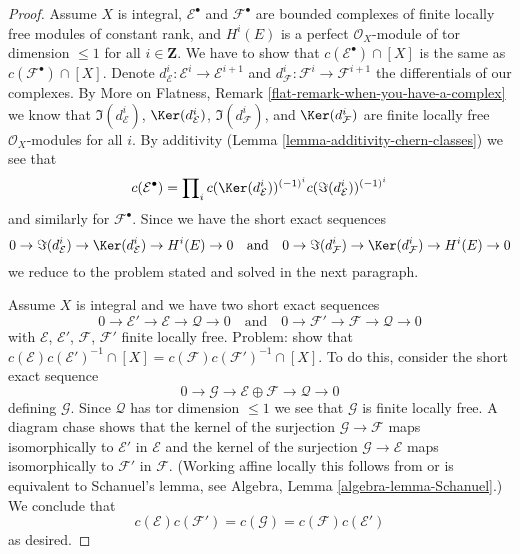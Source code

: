 \begin{proof}
\medskip\noindent
Assume $X$ is integral, $\mathcal{E}^\bullet$ and $\mathcal{F}^\bullet$
are bounded complexes of finite locally free modules of constant rank, and
$H^i(E)$ is a perfect $\mathcal{O}_X$-module of tor dimension $\leq 1$
for all $i \in \mathbf{Z}$. We have to
show that $c(\mathcal{E}^\bullet) \cap [X]$ is the same as
$c(\mathcal{F}^\bullet) \cap [X]$. Denote
$d_\mathcal{E}^i : \mathcal{E}^i \to \mathcal{E}^{i + 1}$ and
$d_\mathcal{F}^i : \mathcal{F}^i \to \mathcal{F}^{i + 1}$
the differentials of our complexes. By
More on Flatness, Remark \ref{flat-remark-when-you-have-a-complex}
we know that $\Im(d_\mathcal{E}^i)$, $\Ker(d_\mathcal{E}^i)$,
$\Im(d_\mathcal{F}^i)$, and $\Ker(d_\mathcal{F}^i)$
are finite locally free $\mathcal{O}_X$-modules for all $i$.
By additivity (Lemma \ref{lemma-additivity-chern-classes}) we see that
$$
c(\mathcal{E}^\bullet) = \prod\nolimits_i
c(\Ker(d_\mathcal{E}^i))^{(-1)^i} c(\Im(d_\mathcal{E}^i))^{(-1)^i}
$$
and similarly for $\mathcal{F}^\bullet$. Since we have the
short exact sequences
$$
0 \to \Im(d_\mathcal{E}^i) \to \Ker(d_\mathcal{E}^i) \to H^i(E) \to 0
\quad\text{and}\quad
0 \to \Im(d_\mathcal{F}^i) \to \Ker(d_\mathcal{F}^i) \to H^i(E) \to 0
$$
we reduce to the problem stated and solved in the next paragraph.

\medskip\noindent
Assume $X$ is integral and we have two short exact sequences
$$
0 \to \mathcal{E}' \to \mathcal{E} \to \mathcal{Q} \to 0
\quad\text{and}\quad
0 \to \mathcal{F}' \to \mathcal{F} \to \mathcal{Q} \to 0
$$
with $\mathcal{E}$, $\mathcal{E}'$, $\mathcal{F}$, $\mathcal{F}'$
finite locally free. Problem: show that
$c(\mathcal{E})c(\mathcal{E}')^{-1} \cap [X] =
c(\mathcal{F})c(\mathcal{F}')^{-1} \cap [X]$.
To do this, consider the short exact sequence
$$
0 \to \mathcal{G} \to \mathcal{E} \oplus \mathcal{F} \to \mathcal{Q} \to 0
$$
defining $\mathcal{G}$. Since $\mathcal{Q}$ has tor dimension $\leq 1$
we see that $\mathcal{G}$ is finite locally free. A diagram chase
shows that the kernel of the surjection $\mathcal{G} \to \mathcal{F}$
maps isomorphically to $\mathcal{E}'$ in $\mathcal{E}$ and
the kernel of the surjection $\mathcal{G} \to \mathcal{E}$ maps
isomorphically to $\mathcal{F}'$ in $\mathcal{F}$. (Working affine
locally this follows from or is equivalent to Schanuel's lemma, see
Algebra, Lemma \ref{algebra-lemma-Schanuel}.)
We conclude that
$$
c(\mathcal{E})c(\mathcal{F}') = c(\mathcal{G}) =
c(\mathcal{F})c(\mathcal{E}')
$$
as desired.
\end{proof}

